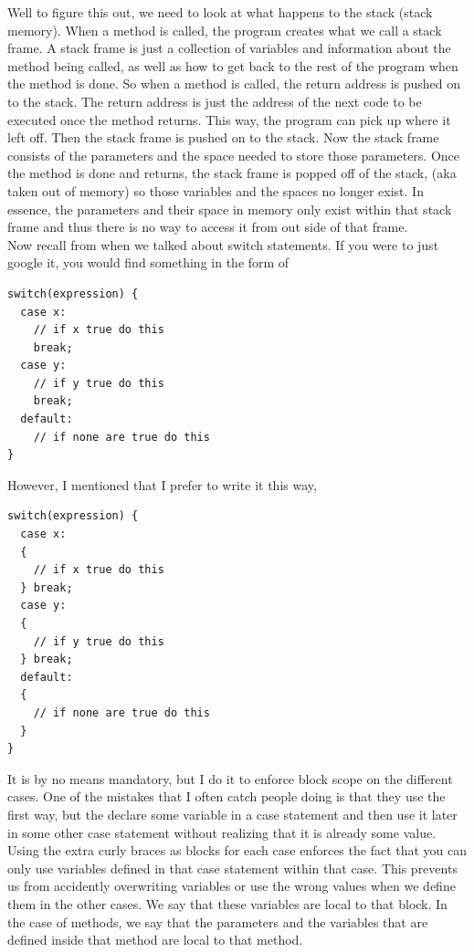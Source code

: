 \documentclass[11]{article}
\begin{document}
Well to figure this out, we need to look at what happens to the stack (stack memory). When a method is called, the program creates what we call a stack frame. A stack frame is just a collection of variables and information about the method being called, as well as how to get back to the rest of the program when the method is done. So when a method is called, the return address is pushed on to the stack. The return address is just the address of the next code to be executed once the method returns. This way, the program can pick up where it left off. Then the stack frame is pushed on to the stack. Now the stack frame consists of the parameters and the space needed to store those parameters. Once the method is done and returns, the stack frame is popped off of the stack, (aka taken out of memory) so those variables and the spaces no longer exist. In essence, the parameters and their space in memory only exist within that stack frame and thus there is no way to access it from out side of that frame.\\

Now recall from when we talked about switch statements. If you were to just google it, you would find something in the form of

\begin{lstlisting}
switch(expression) {
  case x:
    // if x true do this
    break;
  case y:
    // if y true do this
    break;
  default:
    // if none are true do this
}
\end{lstlisting}

However, I mentioned that I prefer to write it this way, 
\begin{lstlisting}
switch(expression) {
  case x:
  {
    // if x true do this
  } break;
  case y:
  {
    // if y true do this
  } break;
  default:
  {
    // if none are true do this
  }
}
\end{lstlisting}

It is by no means mandatory, but I do it to enforce block scope on the different cases. One of the mistakes that I often catch people doing is that they use the first way, but the declare some variable in a case statement and then use it later in some other case statement without realizing that it is already some value. Using the extra curly braces as blocks for each case enforces the fact that you can only use variables defined in that case statement within that case. This prevents us from accidently overwriting variables or use the wrong values when we define them in the other cases. We say that these variables are local to that block. In the case of methods, we say that the parameters and the variables that are defined inside that method are local to that method.\\
\end{document}
